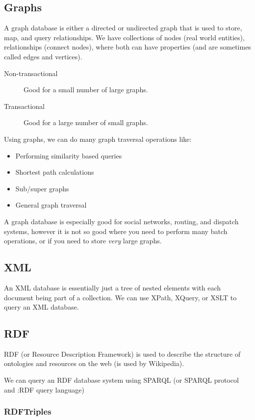 \subsection{Graphs}\label{sub:graphnosql}

A graph database is either a directed or undirected graph that is used to store, map, and query relationships.
We have collections of nodes (real world entities), relationships (connect nodes), where both can have properties (and are sometimes called edges and vertices).
\begin{description}
    \item[Non-transactional] Good for a small number of large graphs.
    \item[Transactional] Good for a large number of small graphs.
\end{description}
Using graphs, we can do many graph traversal operations like:
\begin{itemize}
    \item Performing similarity based queries
    \item Shortest path calculations
    \item Sub/super graphs
    \item General graph traversal
\end{itemize}
A graph database is especially good for social networks, routing, and dispatch systems, however it is not so good where you need to perform many batch operations, or if you need to store \emph{very} large graphs.

\subsection{XML}\label{sub:xmknosql}

An XML database is essentially just a tree of nested elements with each document being part of a collection.
We can use XPath, XQuery, or XSLT to query an XML database.

\subsection{RDF}\label{sub:rdfnosql}

RDF (or Resource Description Framework) is used to describe the structure of ontologies and resources on the web (is used by Wikipedia).

We can query an RDF database system using SPARQL (or SPARQL protocol and :RDF query language)

\subsubsection{RDFTriples}\label{ssub:rdftriples}

